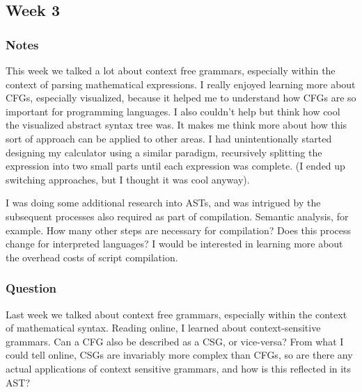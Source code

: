 \documentclass{article}
\theoremstyle{theorem}
\theoremstyle{definition}
\theoremstyle{remark}
\begin{document}
\subsection{Week 3}

\subsubsection*{Notes}
This week we talked a lot about context free grammars, especially within the context of parsing mathematical expressions. I really enjoyed learning more about CFGs, especially visualized, because it helped me to understand how CFGs are so important for programming languages. I also couldn't help but think how cool the visualized abstract syntax tree was. It makes me think more about how this sort of approach can be applied to other areas. I had unintentionally started designing my calculator using a similar paradigm, recursively splitting the expression into two small parts until each expression was complete. (I ended up switching approaches, but I thought it was cool anyway).

I was doing some additional research into ASTs, and was intrigued by the subsequent processes also required as part of compilation. Semantic analysis, for example. How many other steps are necessary for compilation? Does this process change for interpreted languages? I would be interested in learning more about the overhead costs of script compilation.

\subsubsection*{Question} Last week we talked about context free grammars, especially within the context of mathematical syntax. Reading online, I learned about context-sensitive grammars. Can a CFG also be described as a CSG, or vice-versa? From what I could tell online, CSGs are invariably more complex than CFGs, so are there any actual applications of context sensitive grammars, and how is this reflected in its AST?
\end{document}
